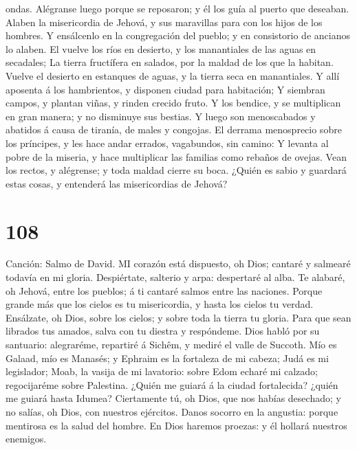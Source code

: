 ondas.  Alégranse luego porque se reposaron; y él los guía
al puerto que deseaban.  Alaben la misericordia de Jehová,
y sus maravillas para con los hijos de los hombres.  Y
ensálcenlo en la congregación del pueblo; y en consistorio de ancianos
lo alaben.  El vuelve los ríos en desierto, y los
manantiales de las aguas en secadales;  La tierra
fructífera en salados, por la maldad de los que la habitan.
 Vuelve el desierto en estanques de aguas, y la tierra seca
en manantiales.  Y allí aposenta á los hambrientos, y
disponen ciudad para habitación;  Y siembran campos, y
plantan viñas, y rinden crecido fruto.  Y los bendice, y se
multiplican en gran manera; y no disminuye sus bestias.  Y
luego son menoscabados y abatidos á causa de tiranía, de males y
congojas.  El derrama menosprecio sobre los príncipes, y
les hace andar errados, vagabundos, sin camino:  Y levanta
al pobre de la miseria, y hace multiplicar las familias como rebaños de
ovejas.  Vean los rectos, y alégrense; y toda maldad cierre
su boca.  ¿Quién es sabio y guardará estas cosas, y
entenderá las misericordias de Jehová?

\hypertarget{section-107}{%
\section{108}\label{section-107}}

 Canción: Salmo de David. MI corazón está dispuesto, oh
Dios; cantaré y salmearé todavía en mi gloria.  Despiértate,
salterio y arpa: despertaré al alba.  Te alabaré, oh Jehová,
entre los pueblos; á ti cantaré salmos entre las naciones. 
Porque grande más que los cielos es tu misericordia, y hasta los cielos
tu verdad.  Ensálzate, oh Dios, sobre los cielos; y sobre
toda la tierra tu gloria.  Para que sean librados tus
amados, salva con tu diestra y respóndeme.  Dios habló por
su santuario: alegraréme, repartiré á Sichêm, y mediré el valle de
Succoth.  Mío es Galaad, mío es Manasés; y Ephraim es la
fortaleza de mi cabeza; Judá es mi legislador;  Moab, la
vasija de mi lavatorio: sobre Edom echaré mi calzado; regocijaréme sobre
Palestina.  ¿Quién me guiará á la ciudad fortalecida?
¿quién me guiará hasta Idumea?  Ciertamente tú, oh Dios,
que nos habías desechado; y no salías, oh Dios, con nuestros ejércitos.
 Danos socorro en la angustia: porque mentirosa es la salud
del hombre.  En Dios haremos proezas: y él hollará nuestros
enemigos.

